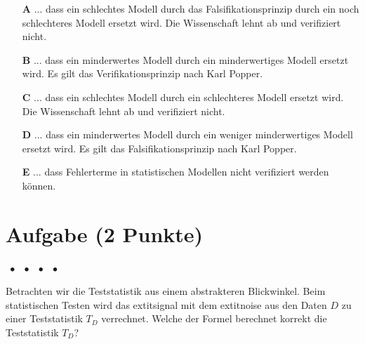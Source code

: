 \documentclass[a4paper, 9pt]{scrartcl}\usepackage[]{graphicx}\usepackage[]{xcolor}
\begin{document}
\begin{enumerate}
\item [\textbf{A} \msquare] ... dass ein schlechtes Modell durch das Falsifikationsprinzip durch ein noch schlechteres Modell ersetzt wird. Die Wissenschaft lehnt ab und verifiziert nicht.
\item [\textbf{B} \msquare] ... dass ein minderwertes Modell durch ein minderwertiges Modell ersetzt wird. Es gilt das Verifikationsprinzip nach Karl Popper.
\item [\textbf{C} \msquare] ... dass ein schlechtes Modell durch ein schlechteres Modell ersetzt wird. Die Wissenschaft lehnt ab und verifiziert nicht.
\item [\textbf{D} \msquare] ... dass ein minderwertes Modell durch ein weniger minderwertiges Modell ersetzt wird. Es gilt das Falsifikationsprinzip nach Karl Popper.
\item [\textbf{E} \msquare] ... dass Fehlerterme in statistischen Modellen nicht verifiziert werden können.
\end{enumerate}

\section{Aufgabe \hfill (2 Punkte)}

\ifcollection
\begin{flushright}
\tiny\vspace{-2Ex}
\textbf{\examinhaltstart}
\exammodulemathstat $\;\bullet$
\exammodulestat $\;\bullet$
\exammodulestatbbv $\;\bullet$
\exammodulestatversuch $\;\bullet$
\exammodulebiostat
\vspace{-1Ex}
\end{flushright}
\fi




Betrachten wir die Teststatistik aus einem abstrakteren Blickwinkel. Beim statistischen Testen wird das 	extit{signal} mit dem 	extit{noise} aus den Daten $D$ zu einer Teststatistik $T_D$ verrechnet. Welche der Formel berechnet korrekt die Teststatistik $T_D$?
\end{document}
